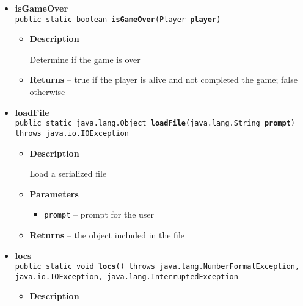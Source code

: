 {{{{{{\begin{itemize}
{\begin{itemize}
{Get the user's input with line break as the delimiter
}
\item{
{\bf  Parameters}
  \begin{itemize}
   \item{
\texttt{prompt} -- prompt for the user}
  \end{itemize}
}%
\item{{\bf  Returns} -- 
the string user entered 
}%
\end{itemize}
}%
\item{ 
{\bf  isGameOver}\\
\texttt{public static boolean\ {\bf  isGameOver}(\texttt{Player} {\bf  player})
\label{personOfInterest.Game.isGameOver(personOfInterest.Player)}}%
\begin{itemize}
\item{
{\bf  Description}

Determine if the game is over
}
\item{{\bf  Returns} -- 
true if the player is alive and not completed the game; false otherwise 
}%
\end{itemize}
}%
\item{ 
{\bf  loadFile}\\
\texttt{public static java.lang.Object\ {\bf  loadFile}(\texttt{java.lang.String} {\bf  prompt}) throws java.io.IOException
\label{personOfInterest.Game.loadFile(java.lang.String)}}%
\begin{itemize}
\item{
{\bf  Description}

Load a serialized file
}
\item{
{\bf  Parameters}
  \begin{itemize}
   \item{
\texttt{prompt} -- prompt for the user}
  \end{itemize}
}%
\item{{\bf  Returns} -- 
the object included in the file 
}%
\end{itemize}
}%
\item{ 
{\bf  locs}\\
\texttt{public static void\ {\bf  locs}() throws java.lang.NumberFormatException, java.io.IOException, java.lang.InterruptedException
\label{personOfInterest.Game.locs()}}%
\begin{itemize}
\item{
{\bf  Description}

}
\end{itemize}}
\end{itemize}}}}}}}
